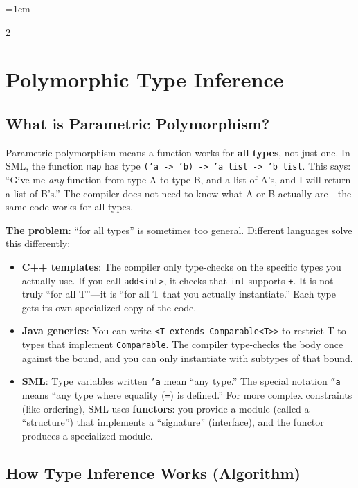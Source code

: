 \documentclass[9pt,landscape]{extarticle}
\begin{document}
\sloppy
\emergencystretch=1em
\begin{multicols}{2}
\raggedcolumns

\section{Polymorphic Type Inference}

\subsection{What is Parametric Polymorphism?}

Parametric polymorphism means a function works for \textbf{all types}, not just one. In SML, the function \texttt{map} has type \texttt{('a -> 'b) -> 'a list -> 'b list}. This says: ``Give me \emph{any} function from type A to type B, and a list of A's, and I will return a list of B's.'' The compiler does not need to know what A or B actually are---the same code works for all types.

\textbf{The problem}: ``for all types'' is sometimes too general. Different languages solve this differently:
\begin{itemize}
  \item \textbf{C++ templates}: The compiler only type-checks on the specific types you actually use. If you call \texttt{add<int>}, it checks that \texttt{int} supports \texttt{+}. It is not truly ``for all T''---it is ``for all T that you actually instantiate.'' Each type gets its own specialized copy of the code.
  \item \textbf{Java generics}: You can write \texttt{<T extends Comparable<T>{}>} to restrict T to types that implement \texttt{Comparable}. The compiler type-checks the body once against the bound, and you can only instantiate with subtypes of that bound.
  \item \textbf{SML}: Type variables written \texttt{'a} mean ``any type.'' The special notation \texttt{''a} means ``any type where equality (\texttt{=}) is defined.'' For more complex constraints (like ordering), SML uses \textbf{functors}: you provide a module (called a ``structure'') that implements a ``signature'' (interface), and the functor produces a specialized module.
\end{itemize}

\subsection{How Type Inference Works (Algorithm)}


\end{multicols}
\end{document}
